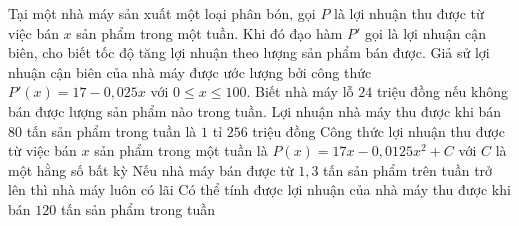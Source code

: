 \begin{ex}
	Tại một nhà máy sản xuất một loại phân bón, gọi $P$ là lợi nhuận thu được từ việc bán $x$ sản phẩm trong một tuần. Khi đó đạo hàm $P'$ gọi là lợi nhuận cận biên, cho biết tốc độ tăng lợi nhuận theo lượng sản phẩm bán được. Giả sử lợi nhuận cận biên của nhà máy được ước lượng bởi công thức $P'(x)=17-0{,}025x$ với $0\le x\le 100$. Biết nhà máy lỗ $24$ triệu đồng nếu không bán được lượng sản phẩm nào trong tuần.
	\choiceTF
	{\True Lợi nhuận nhà máy thu được khi bán $80$ tấn sản phẩm trong tuần là $1$ tỉ $256$ triệu đồng}
	{Công thức lợi nhuận thu được từ việc bán $x$ sản phẩm trong một tuần là $P(x)=17x-0{,}0125x^2+C$ với $C$ là một hằng số bất kỳ}
	{Nếu nhà máy bán được từ $1{,}3$ tấn sản phẩm trên tuần trở lên thì nhà máy luôn có lãi}
	{Có thể tính được lợi nhuận của nhà máy thu được khi bán $120$ tấn sản phẩm trong tuần}
\end{ex}

